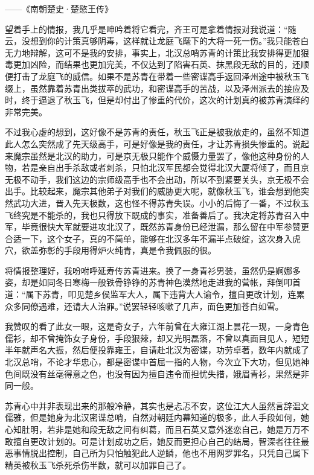 ——《南朝楚史·楚愍王传》

望着手上的情报，我几乎是呻吟着将它看完，齐王可是拿着情报对我说道：“随云，没想到你的计策真够阴毒，这样就让龙庭飞麾下的大将一死一伤。”我只能苍白无力地辩解，这可不是我的安排，事实上，北汉总哨苏青的计策比我安排得更加狠毒更加凶险，而结果也更加完美，不仅达到了陷害石英、抹黑段无敌的目的，还顺便打击了龙庭飞的威信。如果不是苏青在带着一些密谍高手返回泽州途中被秋玉飞缀上，虽然靠着苏青出类拔萃的武功，和密谍高手的苦战，以及泽州派去的接应及时，终于逼退了秋玉飞，但是却付出了惨重的代价，这次的计划真的被苏青演绎的非常完美。

不过我心虚的想到，这好像不是苏青的责任，秋玉飞正是被我放走的，虽然不知道此人怎么突然成了先天级高手，可是好像是我的责任，才让苏青损失惨重的。说起来魔宗虽然是北汉的助力，可是京无极只能作个威慑力量罢了，像他这种身份的人物，若是亲自出手杀敌或者刺杀，只怕北汉军民都会觉得北汉大厦将倾了，而且京无极不动手，我们这边的宗师级高手也不会出动，所以不到紧要关头，京无极不会出手。比较起来，魔宗其他弟子对我们的威胁更大呢，就像秋玉飞，谁会想到他突然武功大进，晋入先天极数，这也怪不得苏青失误。小小的后悔了一番，不过秋玉飞终究是不能杀的，我也只得放下既成的事实，准备善后了。我决定将苏青召入中军，毕竟很快大军就要进攻北汉了，既然苏青身份已经泄漏，那么留在中军参赞更合适一下，这个女子，真的不简单，能够在北汉多年不漏半点破绽，这次身入虎穴，欲盖弥彰的手段用得炉火纯青，真是令我佩服的很。

将情报整理好，我吩咐呼延寿传苏青进来。换了一身青衫男装，虽然仍是婀娜多姿，却是如同冬日寒梅一般铁骨铮铮的苏青神色漠然地走进我的营帐，拜倒叩首道：“属下苏青，叩见楚乡侯监军大人，属下违背大人谕令，擅自更改计划，连累众多同僚遇难，还请大人治罪。”说罢轻轻咳嗽了几声，面色更加苍白如雪。

我赞叹的看了此女一眼，这是奇女子，六年前曾在大雍江湖上昙花一现，一身青色儒衫，却不曾掩饰女子身份，手段狠辣，却又光明磊落，不曾以真面目见人，短短半年就声名大振，然后便投靠雍王，自请赴北汉为密谍，功劳卓著，数年内就成了北汉总哨，不论才华忠心，都是密谍中首屈一指的人物，今次立下大功，但见她神色间既没有丝毫得意之色，也没有因为擅自违令而担忧失措，娥眉青衫，果然是非同一般。

苏青心中并非表现出来的那般冷静，其实也是忐忑不安，这位江大人虽然言辞温文儒雅，但是她身为北汉密谍总哨，自然对朝廷内幕知道的极多，此人手段如何，她心知肚明，若非是她和段无敌之间有纠葛，而且石英又意外迷恋自己，她是万万不敢擅自更改计划的。可是计划成功之后，她反而更担心自己的结局，智深者往往最恶事情脱出控制，自己所为只怕触犯此人逆鳞，他也不用网罗罪名，只凭自己属下精英被秋玉飞杀死杀伤半数，就可以加罪自己了。

